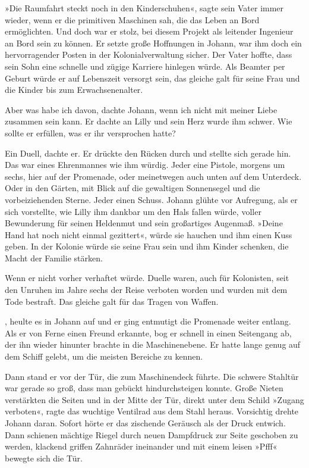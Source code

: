 »Die Raumfahrt steckt noch in den Kinderschuhen«, sagte sein Vater
immer wieder, wenn er die primitiven Maschinen sah, die das Leben
an Bord ermöglichten. Und doch war er stolz, bei diesem Projekt als
leitender Ingenieur an Bord sein zu können. Er setzte große
Hoffnungen in Johann, war ihm doch ein hervorragender Posten in der
Kolonialverwaltung sicher. Der Vater hoffte, dass sein Sohn eine
schnelle und zügige Karriere hinlegen würde. Als Beamter per Geburt
würde er auf Lebenszeit versorgt sein, das gleiche galt für seine
Frau und die Kinder bis zum Erwachsenenalter.

Aber was habe ich davon, dachte Johann, wenn ich nicht mit meiner
Liebe zusammen sein kann. Er dachte an Lilly und sein Herz wurde
ihm schwer. Wie sollte er erfüllen, was er ihr versprochen hatte?

Ein Duell, dachte er. Er drückte den Rücken durch und stellte sich
gerade hin. Das war eines Ehrenmannes wie ihm würdig. Jeder eine
Pistole, morgens um sechs, hier auf der Promenade, oder meinetwegen
auch unten auf dem Unterdeck. Oder in den Gärten, mit Blick auf die
gewaltigen Sonnensegel und die vorbeiziehenden Sterne. Jeder einen
Schuss. Johann glühte vor Aufregung, als er sich vorstellte, wie
Lilly ihm dankbar um den Hals fallen würde, voller Bewunderung für
seinen Heldenmut und sein großartiges Augenmaß. »Deine Hand hat
noch nicht einmal gezittert«, würde sie hauchen und ihm einen Kuss
geben. In der Kolonie würde sie seine Frau sein und ihm Kinder
schenken, die Macht der Familie stärken.

Wenn er nicht vorher verhaftet würde. Duelle waren, auch für
Kolonisten, seit den Unruhen im Jahre sechs der Reise verboten
worden und wurden mit dem Tode bestraft. Das gleiche galt für das
Tragen von Waffen.

,
heulte es in Johann auf und er ging entmutigt die Promenade weiter
entlang. Als er von Ferne einen Freund erkannte, bog er schnell in
einen Seitengang ab, der ihn wieder hinunter brachte in die
Maschinenebene. Er hatte lange genug auf dem Schiff gelebt, um die
meisten Bereiche zu kennen.

Dann stand er vor der Tür, die zum Maschinendeck führte. Die
schwere Stahltür war gerade so groß, dass man gebückt
hindurchsteigen konnte. Große Nieten verstärkten die Seiten und in
der Mitte der Tür, direkt unter dem Schild »Zugang verboten«, ragte
das wuchtige Ventilrad aus dem Stahl heraus. Vorsichtig drehte
Johann daran. Sofort hörte er das zischende Geräusch als der Druck
entwich. Dann schienen mächtige Riegel durch neuen Dampfdruck zur
Seite geschoben zu werden, klackend griffen Zahnräder ineinander
und mit einem leisen »Pfff« bewegte sich die Tür.

